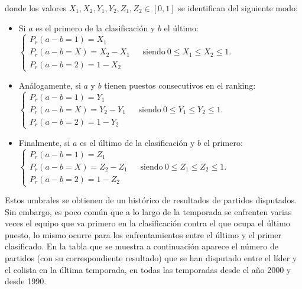donde los valores $X_{1},X_{2},Y_{1},Y_{2},Z_{1},Z_{2} \in [0,1]$ se identifican del siguiente modo:
\begin{itemize}
	\item Si $a$ es el primero de la clasificación y $b$ el último:\\
	 
	 $\begin{cases}
	 	P_{r}(a-b=1)=X_{1}\\
	 	P_{r}(a-b=X)=X_{2}-X_{1} \ \ \ \ \ \ \ \text{siendo} \ 0 \leq X_{1} \leq X_{2} \leq 1.\\
	 	P_{r}(a-b=2)=1-X_{2} 
	 \end{cases}$\\
	 
	\item Análogamente, si $a$ y $b$ tienen puestos consecutivos en el ranking:\\
	
	$\begin{cases}
	P_{r}(a-b=1)=Y_{1}\\
	P_{r}(a-b=X)=Y_{2}-Y_{1} \ \ \ \ \ \ \ \text{siendo} \ 0 \leq Y_{1} \leq Y_{2} \leq 1.\\
	P_{r}(a-b=2)=1-Y_{2} 
	\end{cases}$\\
	
	\item Finalmente, si $a$ es el último de la clasificación y $b$ el primero:\\
	
	$\begin{cases}
	P_{r}(a-b=1)=Z_{1}\\
	P_{r}(a-b=X)=Z_{2}-Z_{1} \ \ \ \ \ \ \ \text{siendo} \ 0 \leq Z_{1} \leq Z_{2} \leq 1.\\
	P_{r}(a-b=2)=1-Z_{2} 
	\end{cases}$
\end{itemize}

Estos umbrales se obtienen de un histórico de resultados de partidos disputados. Sin embargo, es poco común que a lo largo de la temporada se enfrenten varias veces el equipo que va primero en la clasificación contra el que ocupa el último puesto, lo mismo ocurre para los enfrentamientos entre el último y el primer clasificado. En la tabla que se muestra a continuación aparece el número de partidos (con su correspondiente resultado) que se han disputado entre el líder y el colista en la última temporada, en todas las temporadas desde el año 2000 y desde 1990.

